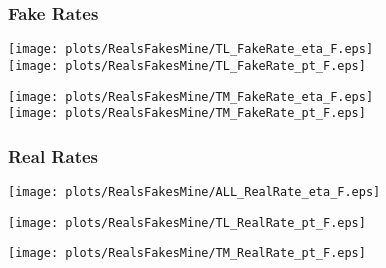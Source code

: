 \begin{frame}
	\frametitle{Fake Rates}
	
	\begin{center}
		\texttt{[image: plots/RealsFakesMine/TL\_FakeRate\_eta\_F.eps]}\\
		\texttt{[image: plots/RealsFakesMine/TL\_FakeRate\_pt\_F.eps]}
	\end{center}
	\begin{center}
		\texttt{[image: plots/RealsFakesMine/TM\_FakeRate\_eta\_F.eps]}\\
		\texttt{[image: plots/RealsFakesMine/TM\_FakeRate\_pt\_F.eps]}
	\end{center}
	\cend
\end{frame}

\begin{frame}
	\frametitle{Real Rates}
	
	\begin{center}
		\texttt{[image: plots/RealsFakesMine/ALL\_RealRate\_eta\_F.eps]}
	\end{center}
	\cend
	\vspace{-10pt}
	\begin{center}
		\texttt{[image: plots/RealsFakesMine/TL\_RealRate\_pt\_F.eps]}
	\end{center}
	\begin{center}
		\texttt{[image: plots/RealsFakesMine/TM\_RealRate\_pt\_F.eps]}
	\end{center}
	\cend
\end{frame}